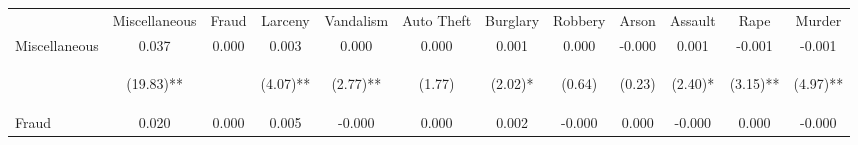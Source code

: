 \begin{tabular}{lccccccccccc}
\toprule \noalign{\smallskip} & Miscellaneous & Fraud & Larceny & Vandalism & Auto Theft & Burglary & Robbery & Arson & Assault & Rape & Murder\\
\noalign{\smallskip}\midrule \noalign{\smallskip}Miscellaneous & 0.037 & 0.000 & 0.003 & 0.000 & 0.000 & 0.001 & 0.000 & -0.000 & 0.001 & -0.001 & -0.001\\
 & \begin{footnotesize}(19.83)**\end{footnotesize} & \begin{footnotesize}\end{footnotesize} & \begin{footnotesize}(4.07)**\end{footnotesize} & \begin{footnotesize}(2.77)**\end{footnotesize} & \begin{footnotesize}(1.77)\end{footnotesize} & \begin{footnotesize}(2.02)*\end{footnotesize} & \begin{footnotesize}(0.64)\end{footnotesize} & \begin{footnotesize}(0.23)\end{footnotesize} & \begin{footnotesize}(2.40)*\end{footnotesize} & \begin{footnotesize}(3.15)**\end{footnotesize} & \begin{footnotesize}(4.97)**\end{footnotesize}\\
\noalign{\smallskip}Fraud & 0.020 & 0.000 & 0.005 & -0.000 & 0.000 & 0.002 & -0.000 & 0.000 & -0.000 & 0.000 & -0.000\\

\end{tabular}
